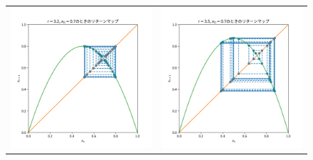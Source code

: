 \begin{figure}[htbp]
\begin{tabular}{cc}
    \begin{minipage}[t]{0.45\hsize}
      \centering
      \includegraphics[keepaspectratio, scale=0.3]{images/Problem1/ctest2_3_2.png}
    \end{minipage} &
    \begin{minipage}[t]{0.45\hsize}
      \centering
      \includegraphics[keepaspectratio, scale=0.3]{images/Problem1/ctest2_4_2.png}
    \end{minipage} \\


\end{tabular}
\end{figure}

